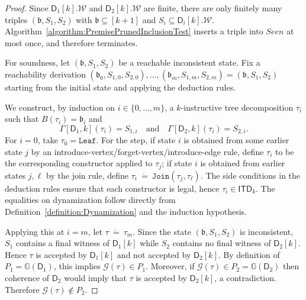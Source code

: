 \documentclass[11pt,a4paper]{article}
\newcommand{\treewidthvalue}{k}
\newcommand{\decompositiongraph}[1]{\mathcal{G}(#1)}
\newcommand{\abag}{\mathfrak{b}}
\newcommand{\jointype}{\mathtt{Join}}
\newcommand{\leaftype}{\mathtt{Leaf}}
\newcommand{\topbagname}{B}
\newcommand{\topbag}[1]{\topbagname(#1)}
\newcommand{\allabstractdecompositionstreewidth}[1]{\mathsf{ITD}_{#1}}
\newcommand{\abstractdecomposition}{\tau}
\newcommand{\defeq}{~\dot{=}~}
\newcommand{\allwitnesses}{\mathcal{W}}
\newcommand{\dpcoregraphproperty}[1]{\mathbb{G}(#1)}
\newcommand{\dpcore}{\mathsf{D}}
\newcommand{\witnessset}{S}
\newcommand{\dynamizationfunctionname}[1]{\Gamma[{#1}]}
\newcommand{\dynamizationfunction}[2]{\dynamizationfunctionname{#1,#2}}
\begin{document}
\begin{proof}
Since $\dpcore_1[\treewidthvalue].\allwitnesses$ and $\dpcore_2[\treewidthvalue].\allwitnesses$ are finite, there are only finitely many triples $(\abag,\witnessset_1,\witnessset_2)$ with $\abag\subseteq[\treewidthvalue+1]$ and $\witnessset_i\subseteq \dpcore_i[\treewidthvalue].\allwitnesses$.
Algorithm~\ref{algorithm:PremisePrunedInclusionTest} inserts a triple into $Seen$ at most once, and therefore terminates.

For soundness, let $(\abag,\witnessset_1,\witnessset_2)$ be a reachable inconsistent state. Fix a reachability derivation
$(\abag_0,\witnessset_{1,0},\witnessset_{2,0}),\dots,(\abag_m,\witnessset_{1,m},\witnessset_{2,m})=(\abag,\witnessset_1,\witnessset_2)$
starting from the initial state and applying the deduction rules.

We construct, by induction on $i\in\{0,\dots,m\}$, a $\treewidthvalue$-instructive tree decomposition $\abstractdecomposition_i$ such that
$\topbag{\abstractdecomposition_i}=\abag_i$ and
\[
\dynamizationfunction{\dpcore_1}{\treewidthvalue}(\abstractdecomposition_i)=\witnessset_{1,i}
\quad\text{and}\quad
\dynamizationfunction{\dpcore_2}{\treewidthvalue}(\abstractdecomposition_i)=\witnessset_{2,i}.
\]
For $i=0$, take $\abstractdecomposition_0=\leaftype$. For the step, if state $i$ is obtained from some earlier state $j$ by an introduce-vertex/forget-vertex/introduce-edge rule, define $\abstractdecomposition_i$ to be the corresponding constructor applied to $\abstractdecomposition_j$; if state $i$ is obtained from earlier states $j,\ell$ by the join rule, define $\abstractdecomposition_i\defeq \jointype(\abstractdecomposition_j,\abstractdecomposition_\ell)$. The side conditions in the deduction rules ensure that each constructor is legal, hence $\abstractdecomposition_i\in \allabstractdecompositionstreewidth{\treewidthvalue}$. The equalities on dynamization follow directly from Definition~\ref{definition:Dynamization} and the induction hypothesis.

Applying this at $i=m$, let $\abstractdecomposition\defeq \abstractdecomposition_m$. Since the state $(\abag,\witnessset_1,\witnessset_2)$ is inconsistent, $\witnessset_1$ contains a final witness of $\dpcore_1[\treewidthvalue]$ while $\witnessset_2$ contains no final witness of $\dpcore_2[\treewidthvalue]$. Hence $\abstractdecomposition$ is accepted by $\dpcore_1[\treewidthvalue]$ and not accepted by $\dpcore_2[\treewidthvalue]$. By definition of $P_1=\dpcoregraphproperty{\dpcore_1}$, this implies $\decompositiongraph{\abstractdecomposition}\in P_1$. Moreover, if $\decompositiongraph{\abstractdecomposition}\in P_2=\dpcoregraphproperty{\dpcore_2}$ then coherence of $\dpcore_2$ would imply that $\abstractdecomposition$ is accepted by $\dpcore_2[\treewidthvalue]$, a contradiction. Therefore $\decompositiongraph{\abstractdecomposition}\notin P_2$.


\end{proof}
\end{document}
